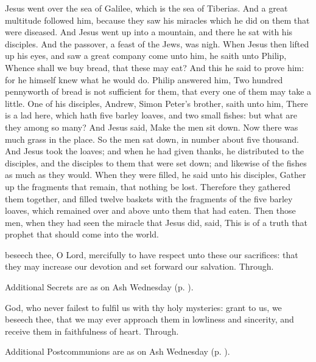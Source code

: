 
 Jesus went over the sea of Galilee, which is the sea of Tiberias. And a great multitude followed him, because they saw his miracles which he did on them that were diseased. And Jesus went up into a mountain, and there he sat with his disciples. And the passover, a feast of the Jews, was nigh. When Jesus then lifted up his eyes, and saw a great company come unto him, he saith unto Philip, Whence shall we buy bread, that these may eat? And this he said to prove him: for he himself knew what he would do. Philip answered him, Two hundred pennyworth of bread is not sufficient for them, that every one of them may take a little. One of his disciples, Andrew, Simon Peter's brother, saith unto him, There is a lad here, which hath five barley loaves, and two small fishes: but what are they among so many? And Jesus said, Make the men sit down. Now there was much grass in the place. So the men sat down, in number about five thousand. And Jesus took the loaves; and when he had given thanks, he distributed to the disciples, and the disciples to them that were set down; and likewise of the fishes as much as they would. When they were filled, he said unto his disciples, Gather up the fragments that remain, that nothing be lost. Therefore they gathered them together, and filled twelve baskets with the fragments of the five barley loaves, which remained over and above unto them that had eaten. Then those men, when they had seen the miracle that Jesus did, said, This is of a truth that prophet that should come into the world.

\secret
{} beseech thee, O Lord, mercifully to have respect unto these our sacrifices: that they may increase our devotion and set forward our salvation. Through.
\begin{rubric}
    Additional Secrets are as on Ash Wednesday (p. \pageref{AshWednesdayMass}).
\end{rubric}
\postcommunion
{} God, who never failest to fulfil us with thy holy mysteries: grant to us, we beseech thee, that we may ever approach them in lowliness and sincerity, and receive them in faithfulness of heart. Through.
\begin{rubric}
    Additional Postcommunions are as on Ash Wednesday (p. \pageref{AshWednesdayMass}).
\end{rubric}

